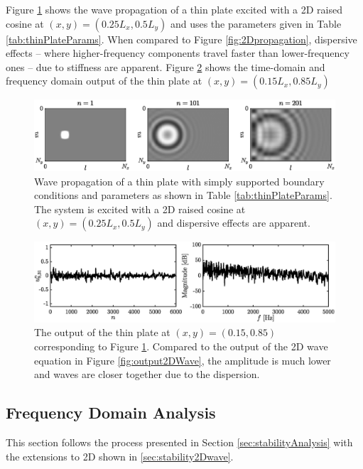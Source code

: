 {\renewcommand{\arraystretch}{1}

Figure \ref{fig:thinPlatePropagation} shows the wave propagation of a thin plate excited with a 2D raised cosine at $(x,y) = (0.25L_x, 0.5L_y)$ and uses the parameters given in Table \ref{tab:thinPlateParams}. When compared to Figure \ref{fig:2Dpropagation}, dispersive effects -- where higher-frequency components travel faster than lower-frequency ones -- due to stiffness are apparent. Figure \ref{fig:outputThinPlate} shows the time-domain and frequency domain output of the thin plate at $(x,y) = (0.15L_x, 0.85 L_y)$

\begin{figure}[h]
    \centering
    \includegraphics[width = \textwidth]{figures/resonators/2d/thinPlatePropagation.eps}
    \caption{Wave propagation of a thin plate with simply supported boundary conditions and parameters as shown in Table \ref{tab:thinPlateParams}. The system is excited with a 2D raised cosine at $(x,y) = (0.25L_x, 0.5L_y)$ and dispersive effects are apparent.\label{fig:thinPlatePropagation}}
\end{figure}

\begin{figure}[h]
    \centering
    \includegraphics[width=\textwidth]{figures/resonators/2d/outputThinPlate.eps}
    \caption{The output of the thin plate at $(x,y) = (0.15, 0.85)$ corresponding to Figure \ref{fig:thinPlatePropagation}. Compared to the output of the 2D wave equation in Figure \ref{fig:output2DWave}, the amplitude is much lower and waves are closer together due to the dispersion. \label{fig:outputThinPlate}}
\end{figure}

\subsection{Frequency Domain Analysis}\label{sec:stabilityThinPlate}
This section follows the process presented in Section \ref{sec:stabilityAnalysis} with the extensions to 2D shown in \ref{sec:stability2Dwave}.

}
